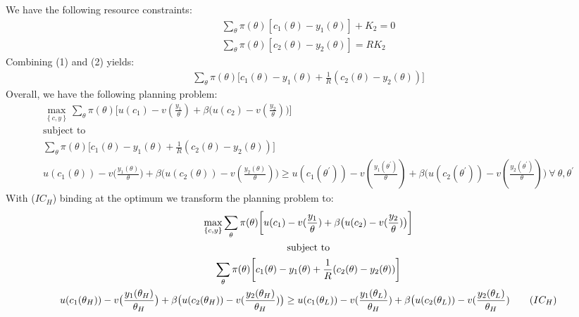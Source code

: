 \documentclass{article}
\begin{document}
We have the following resource constraints:
\begin{gather*}
    \sum_{\theta} \pi (\theta) [c_{1} (\theta) - y_{1}(\theta)] + K_{2} = 0 \tag{1} \\
    \sum_{\theta} \pi (\theta) [c_{2} (\theta) - y_{2}(\theta)] = RK_{2} \tag{2}
\end{gather*}
Combining (1) and (2) yields:
\begin{gather*}
\sum_{\theta} \pi (\theta) \bigg[c_{1}(\theta) - y_{1}(\theta) + \frac{1}{R} (c_{2}(\theta) - y_{2}(\theta)) \bigg]
\end{gather*}
Overall, we have the following planning problem:
\begin{gather*}
    \max_{\left\{ c, y \right\}} \sum_{\theta} \pi(\theta) \bigg[u(c_{1}) - v(\frac{y_{1}}{\theta}) + \beta \big(u(c_{2}) - v(\frac{y_{2}}{\theta}) \big) \bigg] \\
    \text{subject to} \\
    \sum_{\theta} \pi (\theta) \bigg[c_{1}(\theta) - y_{1}(\theta) + \frac{1}{R} (c_{2}(\theta) - y_{2}(\theta)) \bigg] \\
    u(c_{1}(\theta)) - v \big(\frac{y_{1} (\theta)}{\theta} \big) + \beta \big(u(c_{2}(\theta)) - v(\frac{y_{2}(\theta)}{\theta}) \big) \geq u(c_{1}(\theta^{'})) - v(\frac{y_{1}(\theta^{'})}{\theta}) + \beta \big(u(c_{2}(\theta^{'})) - v(\frac{y_{2}(\theta^{'})}{\theta}) \big) \ \forall \ \theta, \theta^{'}
\end{gather*}
With ($IC_{H}$) binding at the optimum we transform the planning problem to:
\begin{gather*}
    \max_{\left\{ c, y \right\}} \sum_{\theta} \pi(\theta) \bigg[u(c_{1}) - v(\frac{y_{1}}{\theta}) + \beta \big(u(c_{2}) - v(\frac{y_{2}}{\theta}) \big) \bigg] \\
    \text{subject to} \\
    \sum_{\theta} \pi (\theta) \bigg[c_{1}(\theta) - y_{1}(\theta) + \frac{1}{R} (c_{2}(\theta) - y_{2}(\theta)) \bigg] \\
    u(c_{1}(\theta_{H})) - v \big(\frac{y_{1} (\theta_{H})}{\theta_{H}} \big) + \beta \big(u(c_{2}(\theta_{H})) - v(\frac{y_{2}(\theta_{H})}{\theta_{H}}) \big) \geq u(c_{1}(\theta_{L})) - v(\frac{y_{1}(\theta_{L})}{\theta_{H}}) + \beta \big(u(c_{2}(\theta_{L})) - v(\frac{y_{2}(\theta_{L})}{\theta_{H}}) \tag{$IC_{H}$}
\end{gather*}
\end{document}
